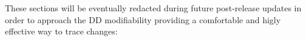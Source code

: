 These sections will be eventually redacted during future post-release updates in order to approach the DD modifiability providing a comfortable and higly effective way to trace changes:
